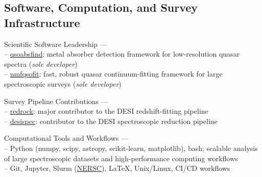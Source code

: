 \documentclass[12pt,letterpaper]{article}
\begin{document}
\vspace{-1.5mm}

\subsection{Software, Computation, and Survey Infrastructure}
\begin{list}{}{\cvlist}
\item Scientific Software Leadership --- \\
-- \href{https://github.com/abhi0395/qsoabsfind}{qsoabsfind}: metal absorber detection framework for low-resolution quasar spectra (\textit{sole developer})\\
-- \href{https://github.com/abhi0395/nmfqsofit}{nmfqsofit}: fast, robust quasar continuum-fitting framework for large spectroscopic surveys (\textit{sole developer})

\item Survey Pipeline Contributions --- \\
-- \href{https://github.com/desihub/redrock}{redrock}: major contributor to the DESI redshift-fitting pipeline\\
-- \href{https://github.com/desihub/desispec}{desispec}: contributor to the DESI spectroscopic reduction pipeline

\item Computational Tools and Workflows --- \\
-- Python (numpy, scipy, astropy, scikit-learn, matplotlib), bash; scalable analysis of large spectroscopic datasets and high-performance computing workflows\\
-- Git, Jupyter, Slurm (\href{https://www.nersc.gov/}{NERSC}), LaTeX, Unix/Linux, CI/CD workflows
\end{list}

\end{document}
